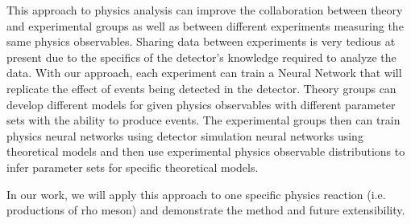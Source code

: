 This approach to physics analysis can improve the collaboration between theory and experimental groups as well as between different experiments measuring the same physics observables. Sharing data between experiments is very tedious at present due to the specifics of the detector's knowledge required to analyze the data. With our approach, each experiment can train a Neural Network that will replicate the effect of events being detected in the detector. Theory groups can develop different models for given physics observables with different parameter sets with the ability to produce events. The experimental groups then can train physics neural networks using detector simulation neural networks using theoretical models and then use experimental physics observable distributions to infer parameter sets for specific theoretical models.

In our work, we will apply this approach to one specific physics reaction (i.e. productions of rho meson) and demonstrate the method and future extensibility.
